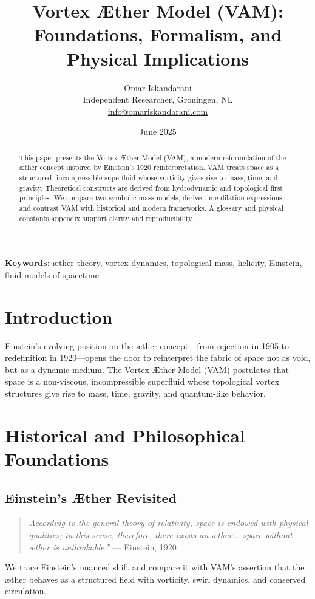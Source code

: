 \documentclass[12pt]{article}
\title{Vortex Æther Model (VAM): Foundations, Formalism, and Physical Implications}
\author{Omar Iskandarani \\ Independent Researcher, Groningen, NL \\ \href{mailto:info@omariskandarani.com}{info@omariskandarani.com}}
\date{June 2025}
\begin{document}
    \maketitle

    \begin{abstract}
        This paper presents the Vortex Æther Model (VAM), a modern reformulation of the æther concept inspired by Einstein's 1920 reinterpretation. VAM treats space as a structured, incompressible superfluid whose vorticity gives rise to mass, time, and gravity. Theoretical constructs are derived from hydrodynamic and topological first principles. We compare two symbolic mass models, derive time dilation expressions, and contrast VAM with historical and modern frameworks. A glossary and physical constants appendix support clarity and reproducibility.
    \end{abstract}

    \vspace{0.5cm}
    \textbf{Keywords:} æther theory, vortex dynamics, topological mass, helicity, Einstein, fluid models of spacetime

    \newpage
    \tableofcontents
    \newpage

    \section{Introduction}
    Einstein's evolving position on the æther concept—from rejection in 1905 to redefinition in 1920—opens the door to reinterpret the fabric of space not as void, but as a dynamic medium. The Vortex Æther Model (VAM) postulates that space is a non-viscous, incompressible superfluid whose topological vortex structures give rise to mass, time, gravity, and quantum-like behavior.

    \section{Historical and Philosophical Foundations}
    \subsection{Einstein's Æther Revisited}
    \begin{quote}
        \textit{\grqq According to the general theory of relativity, space is endowed with physical qualities; in this sense, therefore, there exists an æther... space without æther is unthinkable.\textquotedblright} — Einstein, 1920
    \end{quote}
    We trace Einstein's nuanced shift and compare it with VAM's assertion that the æther behaves as a structured field with vorticity, swirl dynamics, and conserved circulation.
\end{document}
